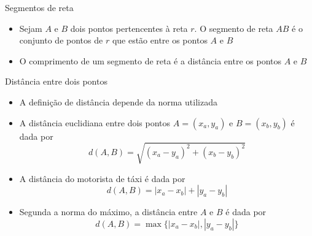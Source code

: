 \begin{frame}[fragile]{Segmentos de reta}

    \begin{itemize}
        \item Sejam $A$ e $B$ dois pontos pertencentes à reta $r$. O segmento de reta $AB$ é o conjunto de pontos de $r$ que estão entre os pontos $A$ e $B$

        \item O comprimento de um segmento de reta é a distância entre os pontos $A$ e $B$
    \end{itemize}

    \begin{center}
    \end{center}

\end{frame}

\begin{frame}[fragile]{Distância entre dois pontos}

    \begin{itemize}
        \item A definição de distância depende da norma utilizada

        \item A distância euclidiana entre dois pontos $A = (x_a, y_a)$ e $B = (x_b, y_b)$ é dada por
        \[
            d(A, B) = \sqrt{(x_a - y_a)^2 + (x_b - y_b)^2}
        \]

        \item A distância do motorista de táxi é dada por
        \[
            d(A, B) = |x_a - x_b| + |y_a - y_b|
        \]

        \item Segunda a norma do máximo, a distância entre $A$ e $B$ é dada por
        \[
            d(A, B) = \max\lbrace |x_a - x_b|, |y_a - y_b|\rbrace
        \]
    \end{itemize}

\end{frame}

